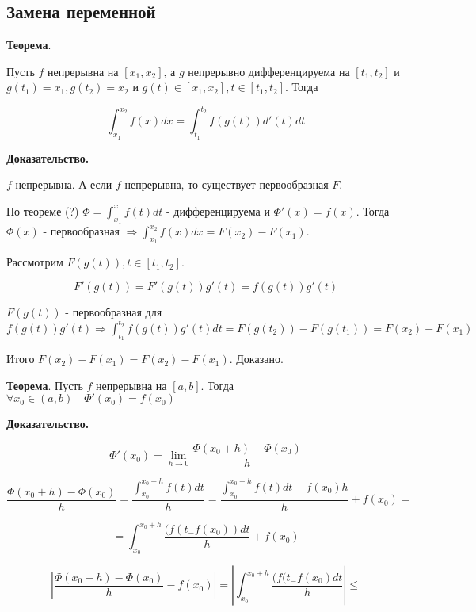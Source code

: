 \documentclass[a4paper]{article}
\begin{document}
\begin{definit}
\subsection*{Замена переменной}

\begin{htheorem}\textbf{Теорема}.

Пусть $f$ непрерывна на $[x_1, x_2]$, а $g$ непрерывно дифференцируема на $[t_1, t_2]$ и $g(t_1) = x_1, g(t_2) = x_2$ и $g(t) \in [x_1, x_2], t \in [t_1, t_2]$. Тогда

\[
\int_{x_1}^{x_2} f(x)dx = \int_{t_1}^{t_2} f(g(t)) d'(t)dt
\]
\end{htheorem}

\begin{hproof}\textbf{Доказательство.}

$f$ непрерывна. А если $f$ непрерывна, то существует первообразная $F$.

По теореме (?) $\Phi = \int_{x_1}^x f(t)dt$ - дифференцируема и $\Phi'(x) = f(x)$. Тогда $\Phi(x)$ - первообразная $\Rightarrow \int_{x_1}^{x_2} f(x)dx = F(x_2) - F(x_1)$.

Рассмотрим $F(g(t)), t \in [t_1, t_2]$.

\[
F'(g(t)) = F'(g(t))g'(t) = f(g(t))g'(t)
\]

$F(g(t))$ - первообразная для $f(g(t))g'(t) \Rightarrow \int_{t_1}^{t_2} f(g(t))g'(t)dt = F(g(t_2)) - F(g(t_1)) = F(x_2) - F(x_1)$

Итого $F(x_2) - F(x_1) = F(x_2) - F(x_1)$. Доказано.
\end{hproof}

\begin{htheorem}\textbf{Теорема}.
Пусть $f$ непрерывна на $[a,b]$. Тогда $\forall x_0 \in (a,b) \quad \Phi'(x_0) = f(x_0)$

\end{htheorem}

\begin{hproof}\textbf{Доказательство.}

\[
\Phi'(x_0) = \lim_{h \rightarrow 0} \frac{\Phi(x_0 + h) - \Phi (x_0)}{h}
\]

\[
\frac{\Phi(x_0 + h) - \Phi (x_0)}{h} = \frac{\int_{x_0}^{x_0+h} f(t)dt}{h} = \frac{\int_{x_0}^{x_0+h} f(t)dt - f(x_0)h}{h} + f(x_0) = 
\]

\[
 = \int_{x_0}^{x_0+h} \frac{(f(t_-f(x_0))dt}{h} + f(x_0)
\]

\[
\left| \frac{\Phi(x_0+h)-\Phi(x_0)}{h} - f(x_0) \right| = \left| \int_{x_0}^{x_0+h} \frac{(f(t_-f(x_0)dt}{h} \right| \leq 
\]


\end{hproof}
\end{definit}
\end{document}
